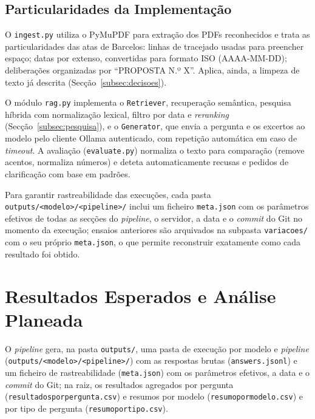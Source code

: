 \documentclass[11pt]{article}
\renewcommand{\_}{\textunderscore\allowbreak}
\begin{document}
\subsection{Particularidades da Implementação}

O \texttt{ingest.py} utiliza o PyMuPDF para extração dos PDFs reconhecidos e trata as particularidades das atas de Barcelos: linhas de tracejado usadas para preencher espaço; datas por extenso, convertidas para formato ISO (AAAA-MM-DD); deliberações organizadas por ``PROPOSTA N.º X''. Aplica, ainda, a limpeza de texto já descrita (Secção~\ref{subsec:decisoes}).

O módulo \texttt{rag.py} implementa o \texttt{Retriever}, recuperação semântica, pesquisa híbrida com normalização lexical, filtro por data e \textit{reranking} (Secção~\ref{subsec:pesquisa}), e o \texttt{Generator}, que envia a pergunta e os excertos ao modelo pelo cliente Ollama autenticado, com repetição automática em caso de \textit{timeout}. A avaliação (\texttt{evaluate.py}) normaliza o texto para comparação (remove acentos, normaliza números) e deteta automaticamente recusas e pedidos de clarificação com base em padrões.

Para garantir rastreabilidade das execuções, cada pasta \texttt{outputs/<modelo>/<pipeline>/} inclui um ficheiro \texttt{meta.json} com os parâmetros efetivos de todas as secções do \textit{pipeline}, o servidor, a data e o \textit{commit} do Git no momento da execução; ensaios anteriores são arquivados na subpasta \texttt{variacoes/} com o seu próprio \texttt{meta.json}, o que permite reconstruir exatamente como cada resultado foi obtido.

\section{Resultados Esperados e Análise Planeada}
\label{sec:resultados}

{\sloppy O \textit{pipeline} gera, na pasta \texttt{outputs/}, uma pasta de execução por modelo e \textit{pipeline} (\texttt{outputs/<modelo>/<pipeline>/}) com as respostas brutas (\texttt{answers.jsonl}) e um ficheiro de rastreabilidade (\texttt{meta.json}) com os parâmetros efetivos, a data e o \textit{commit} do Git; na raiz, os resultados agregados por pergunta (\texttt{resultados\_\allowbreak por\_\allowbreak pergunta.\allowbreak csv}) e resumos por modelo (\texttt{resumo\_\allowbreak por\_\allowbreak modelo.\allowbreak csv}) e por tipo de pergunta (\texttt{resumo\_\allowbreak por\_\allowbreak tipo.\allowbreak csv}).\par}
\end{document}
